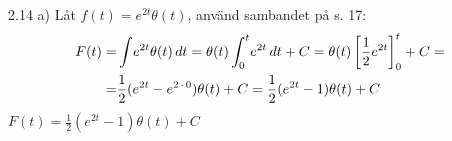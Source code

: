 \begin{task}{2.14 a)}
	Låt $f(t)=e^{2t}\theta(t)$, använd sambandet på s. 17:
	\begin{align*}
	F(t)=
	&\int \! e^{2t}\theta(t) \, dt=
	\theta(t)\int_{0}^{t} \! e^{2t} \, dt+C=
	\theta(t)\left[\frac{1}{2}e^{2t}\right]_{0}^{t}+C= \\ =
	&\frac{1}{2}(e^{2t}-e^{2\operatorname{\cdot}0})\theta(t)+C=
	\frac{1}{2}(e^{2t}-1)\theta(t)+C
	\end{align*}
	\ans $F(t)=\frac{1}{2}(e^{2t}-1)\theta(t)+C$
\end{task}